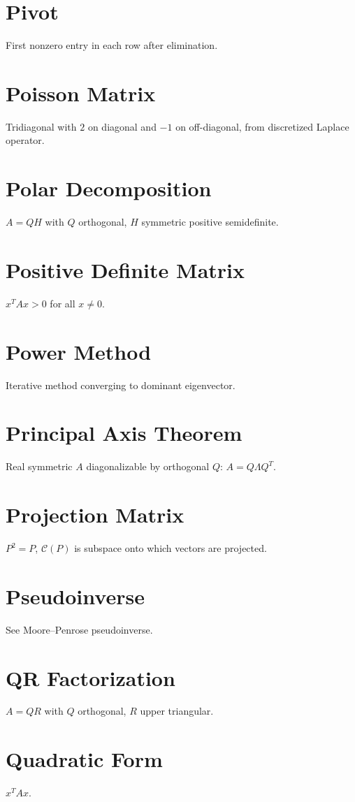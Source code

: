 \documentclass[12pt]{book}
\begin{document}
\chapter{Pivot}
First nonzero entry in each row after elimination.

\chapter{Poisson Matrix}
Tridiagonal with $2$ on diagonal and $-1$ on off-diagonal, from discretized Laplace operator.

\chapter{Polar Decomposition}
$A = Q H$ with $Q$ orthogonal, $H$ symmetric positive semidefinite.

\chapter{Positive Definite Matrix}
$x^T A x > 0$ for all $x \neq 0$.

\chapter{Power Method}
Iterative method converging to dominant eigenvector.

\chapter{Principal Axis Theorem}
Real symmetric $A$ diagonalizable by orthogonal $Q$: $A=Q\Lambda Q^T$.

\chapter{Projection Matrix}
$P^2=P$, $\mathcal{C}(P)$ is subspace onto which vectors are projected.

\chapter{Pseudoinverse}
See Moore–Penrose pseudoinverse.

\chapter{QR Factorization}
$A=QR$ with $Q$ orthogonal, $R$ upper triangular.

\chapter{Quadratic Form}
$x^T A x$.
\end{document}
